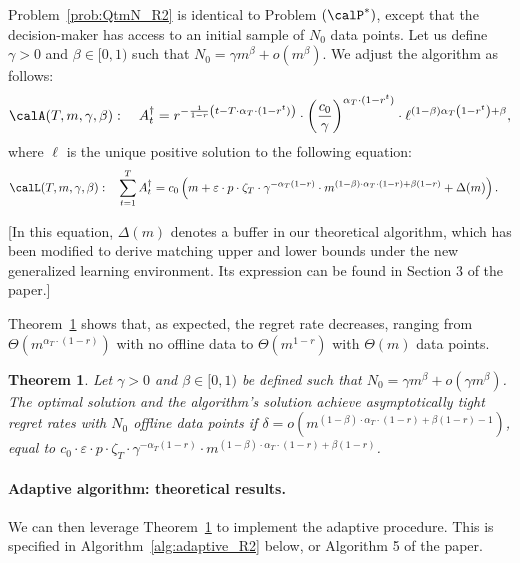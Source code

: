 \documentclass[11pt]{article}
\newtheorem{theorem}{Theorem}[] %
\begin{document}
Problem~\ref{prob:QtmN_R2} is identical to Problem $(\calP^*)$, except that the decision-maker has access to an initial sample of $N_0$ data points. Let us define $\gamma>0$ and $\beta\in[0,1)$ such that $N_0=\gamma m^\beta+o\left(m^\beta\right)$. We adjust the algorithm as follows:
\begin{equation}\label{eq:allocation_QtmN_R2}
    \calA(T,m,\gamma,\beta):\quad A^\dagger_t=r^{-\frac{1}{1-r}\left(t-T\cdot\alpha_T\cdot(1-r^t)\right)}\cdot \left(\frac{c_0}{\gamma}\right)^{\alpha_T\cdot(1-r^t)}\cdot \ell^{(1-\beta)\alpha_T\left(1-r^t\right) + \beta},
\end{equation}
where $\ell$ is the unique positive solution to the following equation:
\begin{align*}
    \calL(T,m,\gamma,\beta):\quad&\sum_{t=1}^T A^\dagger_t=  c_0 \left(m + \varepsilon\cdot p\cdot\zeta_T\cdot \gamma^{-\alpha_T(1-r)}\cdot m^{(1-\beta)\cdot\alpha_T\cdot(1-r)+\beta(1-r)}+ \Delta(m)\right).
\end{align*}

[In this equation, $\Delta(m)$ denotes a buffer in our theoretical algorithm, which has been modified to derive matching upper and lower bounds under the new generalized learning environment. Its expression can be found in Section 3 of the paper.]

Theorem~\ref{thm:offline_R2} shows that, as expected, the regret rate decreases, ranging from $\Theta\left(m^{\alpha_T\cdot(1-r)}\right)$ with no offline data to $\Theta\left(m^{1-r}\right)$ with $\Theta(m)$ data points.
\setcounter{theorem}{1}
\begin{theorem}\label{thm:offline_R2}
	Let $\gamma>0$ and $\beta\in[0,1)$ be defined such that $N_0=\gamma m^\beta+o\left(\gamma m^\beta\right)$. The optimal solution and the algorithm's solution achieve asymptotically tight regret rates with $N_0$ offline data points if $\delta = o\left(m^{(1-\beta)\cdot\alpha_T\cdot(1-r)+\beta(1-r)-1}\right)$, equal to $c_0 \cdot \varepsilon\cdot p\cdot\zeta_T\cdot \gamma^{-\alpha_T(1-r)}\cdot m^{(1-\beta)\cdot\alpha_T\cdot(1-r)+\beta(1-r)}$.
\end{theorem}

\paragraph{Adaptive algorithm: theoretical results.}

We can then leverage Theorem~\ref{thm:offline_R2} to implement the adaptive procedure. This is specified in Algorithm~\ref{alg:adaptive_R2} below, or Algorithm 5 of the paper.
\end{document}
